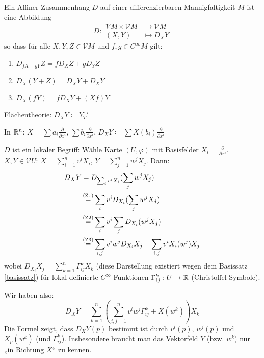 \documentclass[a4paper,twoside,DIV15,BCOR12mm]{scrbook}
\renewcommand{\da}{\coloneqq}
\newcommand{\VM}{\mathcal V M}
\newcommand{\VU}{\mathcal V U}
\begin{document}
\begin{definition}
Ein Affiner Zusammenhang $D$ auf einer differenzierbaren Mannigfaltigkeit $M$ ist eine Abbildung
\[
D: 
\begin{aligned}
\VM \times \VM &\to \VM \\
(X,Y) &\mapsto D_XY
\end{aligned}
\]
so dass für alle $X,Y,Z \in \VM$ und $f,g \in C^\infty M$ gilt:
\begin{enumerate}[(Z1)]
\item $D_{fX + gY} Z = fD_XZ + gD_YZ$
\item $D_X(Y + Z) = D_X Y + D_X Y$
\item $D_X(fY) = fD_XY + (Xf)Y$
\end{enumerate}
\end{definition}

\begin{beispiele}
\item Flächentheorie: $D_X Y \da Y_T'$
\item In $\mathbb{R}^n$: $X= \sum a_i \frac\partial{\partial x^i}$, $\sum b_i \frac\partial{\partial x^i}$, $D_XY\da \sum X(b_i) \frac\partial{\partial x^i}$
\end{beispiele}

$D$ ist ein lokaler Begriff: Wähle Karte $(U,\varphi)$ mit Basisfelder $X_i=\frac\partial{\partial x^i}$. $X,Y\in \VU$: $X=\sum_{i=1}^n v^iX_i$, $Y=\sum_{j=1}^n w^j X_j$. Dann: 
\begin{align*}
D_XY &= D_{\sum_i v^iX_i}(\sum_jw^jX_j) \\
     &\gleichnach{\clap{(Z1)}} \sum_i v^i D_{X_i}(\sum_jw^jX_j) \\
     &\gleichnach{\clap{(Z2)}} \sum_i v^i \sum_j D_{X_i} (w^j X_j) \\
     &\gleichnach{\clap{(Z3)}} \sum_{i,j} v^iw^j D_{X_i}X_j + \sum_{i,j} v^i X_i(w^j)X_j
\end{align*}
wobei $D_{X_i}X_j = \sum_{k=1}^n \Gamma^k_{ij} X_k$ (diese Darstellung existiert wegen dem Basissatz \ref{basissatz}) für lokal definierte $C^\infty$-Funktionen $\Gamma_{ij}^k: U \to \mathbb{R}$ (Christoffel-Symbole)\label{Christoffel-Symbole}.

Wir haben also:
\[
D_XY = \sum_{k=1}^n (\sum_{i,j=1}^n v^i w^j \Gamma_{ij}^k + X(w^k))X_k
\]
Die Formel zeigt, dass $D_XY(p)$ bestimmt ist durch $v^i(p)$, $w^j(p)$ und $X_p(w^k)$ (und $\Gamma_{ij}^k$). Insbesondere braucht man das Vektorfeld $Y$ (bzw. $w^k$) nur „in Richtung $X$“ zu kennen.
\end{document}
